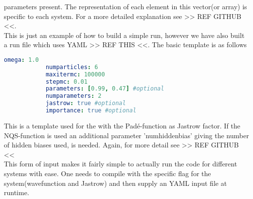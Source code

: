     parameters present. The representation of each element in this vector(or
    array) is specific to each system. For a more detailed explanation see >>
    REF GITHUB <<. \\
    This is just an example of how to build a simple run, however we have also
    built a run file which uses YAML >> REF THIS <<. The basic template is as
    follows
        \begin{lstlisting}[language=yaml]
            omega: 1.0
            numparticles: 6
            maxitermc: 100000
            stepmc: 0.01
            parameters: [0.99, 0.47] #optional
            numparameters: 2
            jastrow: true #optional
            importance: true #optional
        \end{lstlisting}
    This is a template used for the  with the
    Pad\'e-function as Jastrow factor. If the NQS-function is used an
    additional parameter 'numhiddenbias' giving the number of hidden biases
    used, is needed. Again, for more detail see >> REF GITHUB << \\ 
    This form of input makes it fairly simple to actually run the code for
    different systems with ease. One needs to compile with the specific flag
    for the system(wavefunction and Jastrow) and then supply an YAML input file
    at runtime.

